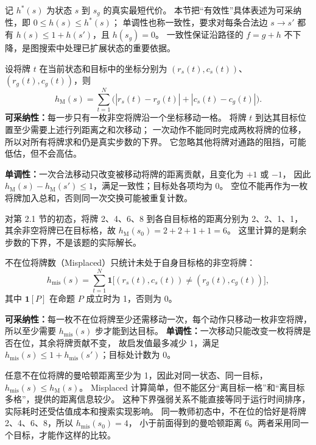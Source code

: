 \par\vspace{2bp}

记 $h^*(s)$ 为状态 $s$ 到 $s_g$ 的真实最短代价。
本节把“有效性”具体表述为可采纳性，即 $0\leq h(s)\leq h^*(s)$；
单调性也称一致性，要求对每条合法边 $s\to s'$ 都有 $h(s)\leq1+h(s')$，且 $h(s_g)=0$。
一致性保证沿路径的 $f=g+h$ 不下降，是图搜索中处理已扩展状态的重要依据。

\par\vspace{2bp}

设将牌 $t$ 在当前状态和目标中的坐标分别为 $(r_s(t),c_s(t))$、$(r_g(t),c_g(t))$，则
\[
h_{\mathrm{M}}(s)=\sum_{t=1}^{N}
\bigl(|r_s(t)-r_g(t)|+|c_s(t)-c_g(t)|\bigr).
\]
\textbf{可采纳性：}每一步只有一枚非空将牌沿一个坐标移动一格。
将牌 $t$ 到达其目标位置至少需要上述行列距离之和次移动；
一次动作不能同时完成两枚将牌的位移，所以对所有将牌求和仍是真实步数的下界。
它忽略其他将牌对通路的阻挡，可能低估，但不会高估。

\textbf{单调性：}一次合法移动只改变被移动将牌的距离贡献，且变化为 $+1$ 或 $-1$，
因此 $h_{\mathrm{M}}(s)-h_{\mathrm{M}}(s')\leq1$，满足一致性；目标处各项均为 0。
空位不能再作为一枚将牌加入总和，否则同一次交换可能被重复计数。

对第 2.1 节的初态，将牌 2、4、6、8 到各自目标格的距离分别为 2、2、1、1，
其余非空将牌已在目标格，故 $h_{\mathrm{M}}(s_0)=2+2+1+1=6$。
这里计算的是剩余步数的下界，不是该题的实际解长。

\par\vspace{2bp}

不在位将牌数（Misplaced）只统计未处于自身目标格的非空将牌：
\[
h_{\mathrm{mis}}(s)=\sum_{t=1}^{N}
\mathbf{1}\bigl[(r_s(t),c_s(t))\neq(r_g(t),c_g(t))\bigr],
\]
其中 $\mathbf{1}[P]$ 在命题 $P$ 成立时为 1，否则为 0。

\textbf{可采纳性：}每一枚不在位将牌至少还需移动一次，每个动作只移动一枚非空将牌，
所以至少需要 $h_{\mathrm{mis}}(s)$ 步才能到达目标。
\textbf{单调性：}一次移动只能改变一枚将牌是否在位，其余将牌贡献不变，
故启发值最多减少 1，满足 $h_{\mathrm{mis}}(s)\leq1+h_{\mathrm{mis}}(s')$；目标处计数为 0。

任意不在位将牌的曼哈顿距离至少为 1，因此对同一状态、同一目标，
$h_{\mathrm{mis}}(s)\leq h_{\mathrm{M}}(s)$。
Misplaced 计算简单，但不能区分“离目标一格”和“离目标多格”，提供的距离信息较少。
这种下界强弱关系不能直接等同于运行时间排序，实际耗时还受估值成本和搜索实现影响。
同一教师初态中，不在位的恰好是将牌 2、4、6、8，所以 $h_{\mathrm{mis}}(s_0)=4$，
小于前面得到的曼哈顿距离 6。两者采用同一个目标，才能作这样的比较。

